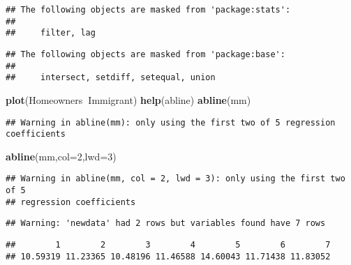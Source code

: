 \documentclass[
]{article}
\newenvironment{Shaded}{\begin{snugshade}}{\end{snugshade}}
\newcommand{\DataTypeTok}[1]{\textcolor[rgb]{0.13,0.29,0.53}{#1}}
\newcommand{\DecValTok}[1]{\textcolor[rgb]{0.00,0.00,0.81}{#1}}
\newcommand{\KeywordTok}[1]{\textcolor[rgb]{0.13,0.29,0.53}{\textbf{#1}}}
\newcommand{\NormalTok}[1]{#1}
\newcommand{\OperatorTok}[1]{\textcolor[rgb]{0.81,0.36,0.00}{\textbf{#1}}}
\newcommand{\StringTok}[1]{\textcolor[rgb]{0.31,0.60,0.02}{#1}}
\begin{document}
\begin{verbatim}
## The following objects are masked from 'package:stats':
## 
##     filter, lag
\end{verbatim}

\begin{verbatim}
## The following objects are masked from 'package:base':
## 
##     intersect, setdiff, setequal, union
\end{verbatim}

\begin{Shaded}
\begin{Highlighting}[]
\KeywordTok{plot}\NormalTok{(Homeowners}\OperatorTok{~}\NormalTok{Immigrant)}
\KeywordTok{help}\NormalTok{(abline)}
\KeywordTok{abline}\NormalTok{(mm)}
\end{Highlighting}
\end{Shaded}

\begin{verbatim}
## Warning in abline(mm): only using the first two of 5 regression coefficients
\end{verbatim}

\begin{Shaded}
\begin{Highlighting}[]
\KeywordTok{abline}\NormalTok{(mm,}\DataTypeTok{col=}\DecValTok{2}\NormalTok{,}\DataTypeTok{lwd=}\DecValTok{3}\NormalTok{)}
\end{Highlighting}
\end{Shaded}

\begin{verbatim}
## Warning in abline(mm, col = 2, lwd = 3): only using the first two of 5
## regression coefficients
\end{verbatim}

\begin{Shaded}
\end{Shaded}

\begin{verbatim}
## Warning: 'newdata' had 2 rows but variables found have 7 rows
\end{verbatim}

\begin{verbatim}
##        1        2        3        4        5        6        7 
## 10.59319 11.23365 10.48196 11.46588 14.60043 11.71438 11.83052
\end{verbatim}
\end{document}

